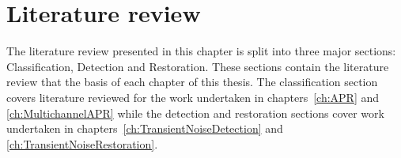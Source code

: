 \chapter{Literature review}\label{ch:LiteratureReview}

\ifpdf
    \graphicspath{{Chapter2_LitReview/Chapter2Figs/PNG/}{Chapter2_LitReview/Chapter2Figs/PDF/}{Chapter2_LitReview/Chapter2Figs/}{Chapter2_LitReview/Chapter2Figs/Classification/}{Chapter2_LitReview/Chapter2Figs/Detection/}{Chapter2_LitReview/Chapter2Figs/Restoration}}
\else
    \graphicspath{{Chapter2_LitReview/Chapter2Figs/EPS/}{Chapter2_LitReview/Chapter2Figs/}}
\fi

The literature review presented in this chapter is split into three major sections: Classification, Detection and Restoration. These sections contain the literature review that \DIFdelbegin {}\DIFdelend \DIFaddbegin {}\DIFaddend the basis of each chapter of this thesis. The classification section covers literature reviewed for the work undertaken in chapters~\ref{ch:APR} and \ref{ch:MultichannelAPR} while the detection and restoration sections cover work undertaken in chapters~\ref{ch:TransientNoiseDetection} and \ref{ch:TransientNoiseRestoration}.

